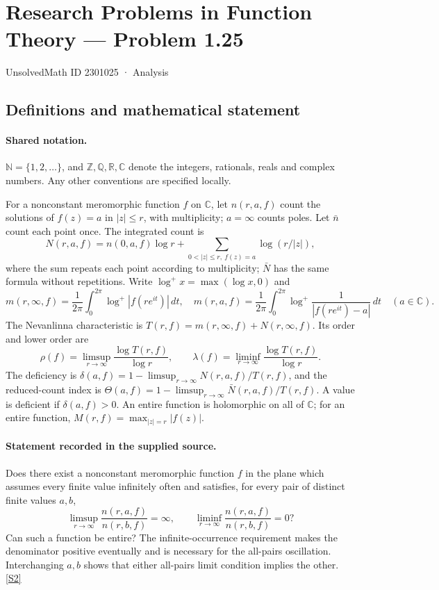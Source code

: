 \documentclass[11pt]{article}
\newcommand{\sref}[2]{\hyperlink{source:#1:#2}{[S#2]}}
\begin{document}
\setcounter{section}{2301024}
\section{Research Problems in Function Theory — Problem 1.25}\label{2301025}
{\small\sffamily UnsolvedMath ID 2301025 · Analysis}
\subsection{Definitions and mathematical statement}

\paragraph{Shared notation.}$\mathbb N=\{1,2,\ldots\}$, and $\mathbb Z,\mathbb Q,\mathbb R,\mathbb C$ denote the integers, rationals, reals and complex numbers. Any other conventions are specified locally.


For a nonconstant meromorphic function $f$ on $\mathbb C$, let $n(r,a,f)$ count the solutions of $f(z)=a$ in $|z|\le r$, with multiplicity; $a=\infty$ counts poles. Let $\bar n$ count each point once. The integrated count is
\[
 N(r,a,f)=n(0,a,f)\log r+\sum_{0<|z|\le r,\ f(z)=a}\log(r/|z|),
\]
where the sum repeats each point according to multiplicity; $\bar N$ has the same formula without repetitions. Write $\log^+x=\max(\log x,0)$ and
\[
 m(r,\infty,f)=\frac1{2\pi}\int_0^{2\pi}\log^+|f(re^{it})|\,dt,\quad
 m(r,a,f)=\frac1{2\pi}\int_0^{2\pi}\log^+\frac1{|f(re^{it})-a|}\,dt\quad(a\in\mathbb C).
\]
The Nevanlinna characteristic is $T(r,f)=m(r,\infty,f)+N(r,\infty,f)$. Its order and lower order are
\[
 \rho(f)=\limsup_{r\to\infty}\frac{\log T(r,f)}{\log r},\qquad
 \lambda(f)=\liminf_{r\to\infty}\frac{\log T(r,f)}{\log r}.
\]
The deficiency is $\delta(a,f)=1-\limsup_{r\to\infty}N(r,a,f)/T(r,f)$, and the reduced-count index is $\Theta(a,f)=1-\limsup_{r\to\infty}\bar N(r,a,f)/T(r,f)$. A value is deficient if $\delta(a,f)>0$. An entire function is holomorphic on all of $\mathbb C$; for an entire function, $M(r,f)=\max_{|z|=r}|f(z)|$.
\paragraph{Statement recorded in the supplied source.}
Does there exist a nonconstant meromorphic function $f$ in the plane which assumes every finite value infinitely often and satisfies, for every pair of distinct finite values $a,b$,
\[
 \limsup_{r\to\infty}\frac{n(r,a,f)}{n(r,b,f)}=\infty,\qquad
 \liminf_{r\to\infty}\frac{n(r,a,f)}{n(r,b,f)}=0?
\]
Can such a function be entire? The infinite-occurrence requirement makes the denominator positive eventually and is necessary for the all-pairs oscillation. Interchanging $a,b$ shows that either all-pairs limit condition implies the other. \sref{2301025}{2}
\end{document}
